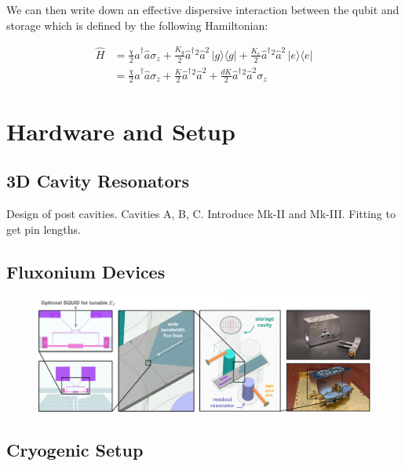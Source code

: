 We can then write down an effective dispersive interaction between the qubit and storage which is defined by the following Hamiltonian:

\begin{align*}
\hat{H} &= \frac{\chi}{2} \hat{a}^\dagger\hat{a} \sigma_z + \frac{K_g}{2} \hat{a}^\dagger{}^2\hat{a}^2 \,|g\rangle\langle g| + \frac{K_e}{2} \hat{a}^\dagger{}^2\hat{a}^2 \,|e\rangle\langle e| \\
&= \frac{\chi}{2} \hat{a}^\dagger\hat{a} \sigma_z + \frac{K}{2} \hat{a}^\dagger{}^2\hat{a}^2 + \frac{dK}{2}\hat{a}^\dagger{}^2\hat{a}^2 \sigma_z
\end{align*}


\section{Hardware and Setup}

\subsection{3D Cavity Resonators \label{sec:4_3D_Cavity_Resonators}}

Design of post cavities. Cavities A, B, C. Introduce Mk-II and Mk-III. Fitting to get pin lengths. 

\subsection{Fluxonium Devices}


\begin{figure}[h]
    \centering
    \includegraphics[width=\linewidth]{Figures/4/3DGKP-Schematic.pdf}
    \caption{}
    \label{fig:4-3DGKP-schematic}
\end{figure}



\subsection{Cryogenic Setup}


